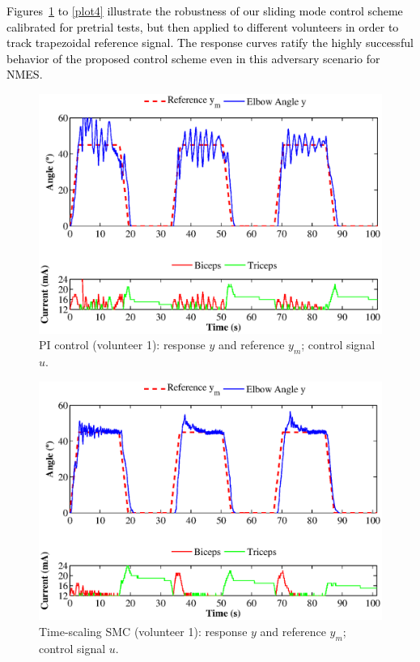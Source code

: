\documentclass[review]{elsarticle}
\begin{document}
\textcolor{black}{Figures~\ref{plot1} to \ref{plot4} %
illustrate the robustness of our sliding mode control scheme calibrated for pretrial tests, but then applied to different volunteers in order to track trapezoidal reference signal. The response curves ratify the highly successful behavior of the proposed control scheme even in this adversary scenario for NMES.}
\begin{figure}[!htb]
\begin{center}
\includegraphics[width=12cm]{VIC1204PI.eps}
\caption{PI control (volunteer 1): response $y$ and reference $y_m$; control signal $u$.}
\label{plot1}
\end{center}
\end{figure}
%
%
\begin{figure}[!htb]
\begin{center}
\includegraphics[width=12cm]{VIC1204PIRele.eps}
\caption{Time-scaling SMC (volunteer 1): response $y$ and reference $y_m$; control signal $u$.}
\label{plot2}
\end{center}
\end{figure}
\end{document}
